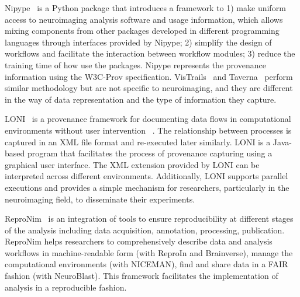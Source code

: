 Nipype~\cite{gorgolewski2011nipype} is a Python package that 
introduces a framework to 1) make uniform access to neuroimaging 
analysis software and usage information, which allows mixing components 
from other packages developed in different programming languages through 
interfaces provided by Nipype; 2) simplify the design of workflows and 
facilitate the interaction between workflow modules; 3) reduce the 
training time of how use the packages. Nipype represents the provenance 
information using the W3C-Prov specification.
VisTrails~\cite{callahan2006vistrails} and 
Taverna~\cite{oinn2004taverna} perform similar methodology but are not 
specific to neuroimaging, and they are different in the way of 
data representation and the type of information they capture. 

LONI~\cite{rex2003loni} is a 
provenance framework for documenting data flows in computational 
environments without user intervention 
~\cite{mackenzie2008neuroimaging}. The
relationship between processes is captured in an XML file 
format and re-executed later similarly. 
LONI is a Java-based 
program that facilitates the process of provenance capturing using a 
graphical user interface. The XML extension provided by LONI can 
be interpreted across different environments. Additionally,
LONI supports parallel executions and provides a simple mechanism for researchers,
particularly in the neuroimaging field, to disseminate their experiments.

ReproNim~\cite{kennedy2019everything} is an 
integration of tools to ensure reproducibility at
different stages of the analysis including data 
acquisition, annotation, processing, publication. ReproNim helps 
researchers to comprehensively describe data and analysis workflows in 
machine-readable form (with ReproIn and Brainverse), manage 
the computational environments (with NICEMAN), find and share data in a 
FAIR fashion (with NeuroBlast). This framework facilitates the 
implementation of analysis in a reproducible fashion. 



